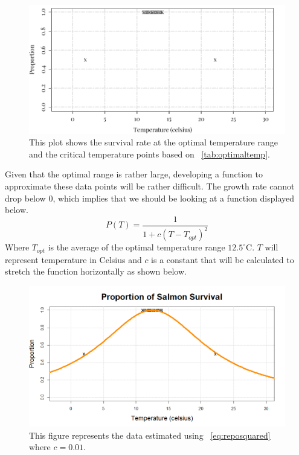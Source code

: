 \begin{figure}[H]
    \centering
    \includegraphics[width=14cm]{Pictures/Salmon Pop/salmon repo model/proportion survival.png}
    \caption{This plot shows the survival rate at the optimal temperature range and the critical temperature points based on \tablename~\ref{tab:optimaltemp}.}
    \label{fig:reproductionpoints}
\end{figure}
Given that the optimal range is rather large, developing a function to approximate these data points will be rather difficult.
The growth rate cannot drop below 0, which implies that we should be looking at a function displayed below.
\begin{equation}\label{eq:reposquared}
    P(T) = \frac{1}{1+c(T-T_{opt})^2}
\end{equation}
Where $T_{opt}$ is the average of the optimal temperature range $12.5^{\circ}$C. $T$ will represent temperature in Celsius and $c$ is a constant that will be calculated to stretch the function horizontally as shown below.
\begin{figure}[H]
    \centering
    \includegraphics[width=14cm]{Pictures/Salmon Pop/salmon repo model/repo function plot squared.png}
    \caption{This figure represents the data estimated using \equationautorefname~\eqref{eq:reposquared} where $c=0.01$.}
    \label{fig:reporductioncurve2}
\end{figure}
